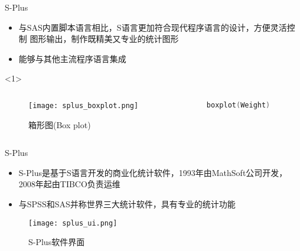 \begin{frame}[t, fragile]{\subsecname}{S-Plus}
    \begin{itemize}
      \item 与SAS内置脚本语言相比，S语言更加符合现代程序语言的设计，方便灵活控制
            图形输出，制作既精美又专业的统计图形
      \item 能够与其他主流程序语言集成
    \end{itemize}

    \begin{onlyenv}<1>
      \begin{columns}
        \begin{column}{.7\textwidth}
          \begin{figure}
            \centering
            \texttt{[image: splus\_boxplot.png]}
            \caption{箱形图(Box plot)}
          \end{figure}
        \end{column}

        \begin{column}{.3\textwidth}
\begin{lstlisting}[language=S]
  boxplot(Weight)
\end{lstlisting}
        \end{column}
      \end{columns}
    \end{onlyenv}
\end{frame}    

\begin{frame}[t]{\subsecname}{S-Plus}
    \begin{itemize}
      \item S-Plus是基于S语言开发的商业化统计软件，1993年由MathSoft公司开发，
            2008年起由TIBCO负责运维
      \item 与SPSS和SAS并称世界三大统计软件，具有专业的统计功能
    \end{itemize}

    \begin{figure}
      \centering \texttt{[image: splus\_ui.png]}
      \caption{S-Plus软件界面}
    \end{figure}
\end{frame}    

